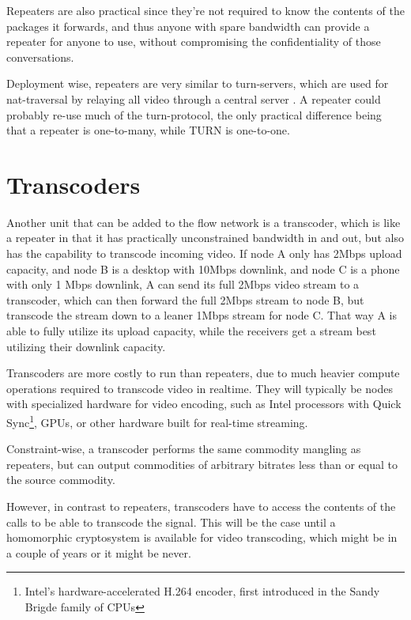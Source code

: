 Repeaters are also practical since they're not required to know the contents of the packages it forwards, and thus anyone with spare bandwidth can provide a repeater for anyone to use, without compromising the confidentiality of those conversations.

Deployment wise, repeaters are very similar to \gls{turn}-servers, which are used for \gls{nat}-traversal by relaying all video through a central server \cite{rfc5766}. A repeater could probably re-use much of the \gls{turn}-protocol, the only practical difference being that a repeater is one-to-many, while TURN is one-to-one.


\section{Transcoders}

Another unit that can be added to the flow network is a transcoder, which is like a repeater in that it has practically unconstrained bandwidth in and out, but also has the capability to transcode incoming video. If node A only has 2Mbps upload capacity, and node B is a desktop with 10Mbps downlink, and node C is a phone with only 1 Mbps downlink, A can send its full 2Mbps video stream to a transcoder, which can then forward the full 2Mbps stream to node B, but transcode the stream down to a leaner 1Mbps stream for node C. That way A is able to fully utilize its upload capacity, while the receivers get a stream best utilizing their downlink capacity.

Transcoders are more costly to run than repeaters, due to much heavier compute operations required to transcode video in realtime. They will typically be nodes with specialized hardware for video encoding, such as Intel processors with Quick Sync\footnote{Intel's hardware-accelerated H.264 encoder, first introduced in the Sandy Brigde family of CPUs}, GPUs, or other hardware built for real-time streaming.

Constraint-wise, a transcoder performs the same commodity mangling as repeaters, but can output commodities of arbitrary bitrates less than or equal to the source commodity.

However, in contrast to repeaters, transcoders have to access the contents of the calls to be able to transcode the signal. This will be the case until a homomorphic cryptosystem is available for video transcoding, which might be in a couple of years or it might be never.


